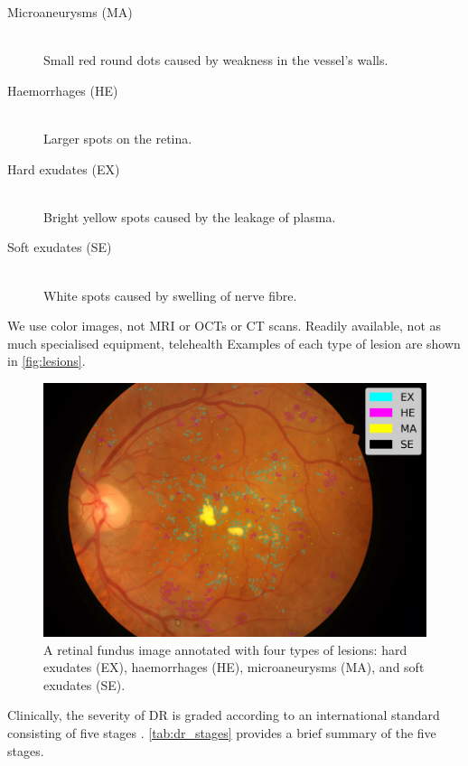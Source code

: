 \begin{description}
    \item[Microaneurysms (MA)] \hfill \\ Small red round dots caused by weakness in the vessel's walls.
    \item[Haemorrhages (HE)] \hfill \\ Larger spots on the retina.
    \item[Hard exudates (EX)] \hfill \\ Bright yellow spots caused by the leakage of plasma.
    \item[Soft exudates (SE)] \hfill \\ White spots caused by swelling of nerve fibre.
\end{description}

We use color images, not MRI or OCTs or CT scans. Readily available, not as much specialised equipment, telehealth Examples of each type of lesion are shown in \autoref{fig:lesions}.

\begin{figure}
    \centering
    \includegraphics{background/figs/example_output.png}
    \caption{A retinal fundus image annotated with four types of lesions: hard exudates (EX), haemorrhages (HE), microaneurysms (MA), and soft exudates (SE).}
    \label{fig:lesions}
\end{figure}

Clinically, the severity of DR is graded according to an international standard consisting of five stages \cite{ophthalmoscopy2002international}. \autoref{tab:dr_stages} provides a brief summary of the five stages.

